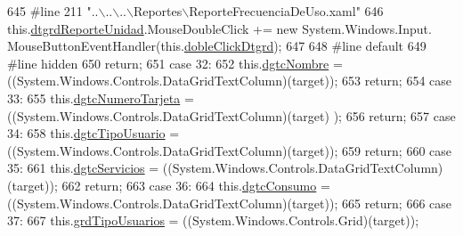 \begin{DoxyCode}
645 \textcolor{preprocessor}{            #line 211 "..\(\backslash\)..\(\backslash\)..\(\backslash\)Reportes\(\backslash\)ReporteFrecuenciaDeUso.xaml"}
646 \textcolor{preprocessor}{}            this.\hyperlink{class_proyecto___integrador__3_1_1_reportes_1_1_reporte_frecuencia_de_uso_a76928c8b382b0997a3e7a9f57369c6c0}{dtgrdReporteUnidad}.MouseDoubleClick += \textcolor{keyword}{new} System.Windows.Input.
      MouseButtonEventHandler(this.\hyperlink{class_proyecto___integrador__3_1_1_reportes_1_1_reporte_frecuencia_de_uso_a7e667426a6de02c099f4ad03df9c7853}{dobleClickDtgrd});
647             
648 \textcolor{preprocessor}{            #line default}
649 \textcolor{preprocessor}{}\textcolor{preprocessor}{            #line hidden}
650 \textcolor{preprocessor}{}            \textcolor{keywordflow}{return};
651             \textcolor{keywordflow}{case} 32:
652             this.\hyperlink{class_proyecto___integrador__3_1_1_reportes_1_1_reporte_frecuencia_de_uso_ae9f936afc28740aa73600b6ebd3bb07c}{dgtcNombre} = ((System.Windows.Controls.DataGridTextColumn)(target));
653             \textcolor{keywordflow}{return};
654             \textcolor{keywordflow}{case} 33:
655             this.\hyperlink{class_proyecto___integrador__3_1_1_reportes_1_1_reporte_frecuencia_de_uso_a3c20691f91322ac840de110154029356}{dgtcNumeroTarjeta} = ((System.Windows.Controls.DataGridTextColumn)(target)
      );
656             \textcolor{keywordflow}{return};
657             \textcolor{keywordflow}{case} 34:
658             this.\hyperlink{class_proyecto___integrador__3_1_1_reportes_1_1_reporte_frecuencia_de_uso_a62c05d7f22acb7b7a12bc1e8777906cc}{dgtcTipoUsuario} = ((System.Windows.Controls.DataGridTextColumn)(target));
659             \textcolor{keywordflow}{return};
660             \textcolor{keywordflow}{case} 35:
661             this.\hyperlink{class_proyecto___integrador__3_1_1_reportes_1_1_reporte_frecuencia_de_uso_ace0842b0e456ad2ad1cf360884b6c699}{dgtcServicios} = ((System.Windows.Controls.DataGridTextColumn)(target));
662             \textcolor{keywordflow}{return};
663             \textcolor{keywordflow}{case} 36:
664             this.\hyperlink{class_proyecto___integrador__3_1_1_reportes_1_1_reporte_frecuencia_de_uso_af2b92d2a2c7a62227fa89dc9bf22009b}{dgtcConsumo} = ((System.Windows.Controls.DataGridTextColumn)(target));
665             \textcolor{keywordflow}{return};
666             \textcolor{keywordflow}{case} 37:
667             this.\hyperlink{class_proyecto___integrador__3_1_1_reportes_1_1_reporte_frecuencia_de_uso_a07daaedf61ed6ed6d9b36a92b037dd53}{grdTipoUsuarios} = ((System.Windows.Controls.Grid)(target));

\end{DoxyCode}
